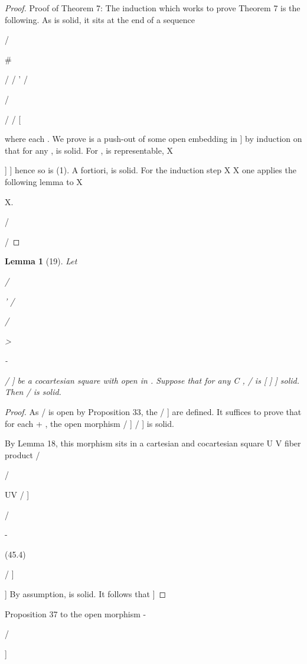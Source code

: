 \documentclass[11pt,a4paper]{article}
\theoremstyle{plain}
\newtheorem{lemma}[theorem]{Lemma}
\theoremstyle{definition}
\begin{document}
\begin{proof}
Proof of Theorem 7: The induction which works to prove Theorem 7 is the following. As is solid, it sits at the end of a sequence

/

\#

/ /
'
/


/

/ /
[

where each 
. We prove
  is a push-out of some open embedding in
]
by induction on that for any , 
is
solid.
For
,
is
representable,
X

]
]
hence so is 
(1). A fortiori, 
is solid. For the induction step
X
X
one applies the following lemma to 
X
 
X.

 /

/

\end{proof}

\begin{lemma}[19]
Let


/

' /


/

  


>

-

/ 
]
be a cocartesian square with  open in  . Suppose that for any C , /
is
[
]
]
solid. Then /
is solid.
\end{lemma}

\begin{proof} As /
is open by Proposition 33, the   / ]
 are defined. It suffices
to prove that for each + , the open morphism   / ]
  / ] is solid.
 
By Lemma 18, this morphism sits in a cartesian and cocartesian square
U V
fiber product 
/

  / 





UV
  / ]  

/



-

(45.4)

  / ]

]
By assumption,
is solid. It follows that
]
\end{proof}

Proposition 37 to the open morphism
- 

/

]
\end{document}
